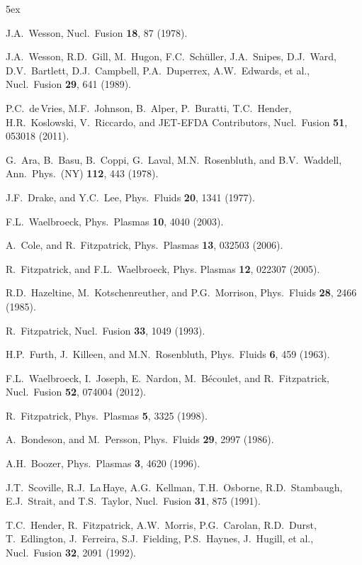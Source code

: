 \documentclass[12pt,prb,aps]{revtex4-1}
\begin{document}
\begin{thebibliography}{99}\baselineskip 5ex

 J.A.~Wesson, Nucl.\ Fusion {\bf 18}, 87 (1978).

 J.A.~Wesson, R.D.~Gill, M.~Hugon, F.C.~Sch\"{u}ller, J.A.~Snipes, D.J.~Ward, D.V.~Bartlett, 
D.J.~Campbell, P.A.~Duperrex, A.W.~Edwards, et al., Nucl.\ Fusion {\bf 29}, 641 (1989).

 P.C.~de\,Vries, M.F.~Johnson, B.~Alper, P.~Buratti, T.C.~Hender, H.R.~Koslowski, V.~Riccardo, and JET-EFDA Contributors, Nucl.\ Fusion {\bf 51}, 053018 (2011).

 G.~Ara, B.~Basu, B.~Coppi, G.~Laval, M.N.~Rosenbluth, and B.V.~Waddell, Ann.\ Phys.\ (NY) {\bf 112}, 443 (1978).

 J.F.~Drake, and Y.C.~Lee, Phys.\ Fluids {\bf 20}, 1341 (1977).

 F.L.~Waelbroeck, Phys.\ Plasmas {\bf 10}, 4040 (2003).

 A.~Cole, and R.~Fitzpatrick, Phys.\ Plasmas {\bf 13}, 032503 (2006).

 R.~Fitzpatrick, and F.L.~Waelbroeck, Phys. Plasmas {\bf 12}, 022307 (2005).

 R.D.~Hazeltine, M.~Kotschenreuther, and P.G.~Morrison, Phys.\ Fluids {\bf 28}, 2466 (1985).

 R.~Fitzpatrick, Nucl.\ Fusion {\bf 33}, 1049 (1993).

 H.P.~Furth, J.~Killeen, and M.N.~Rosenbluth, Phys.\ Fluids {\bf 6}, 459 (1963).

 F.L.~Waelbroeck,  I.~Joseph, E.~Nardon, M.~B\'{e}coulet, and R.~Fitzpatrick, Nucl.\ Fusion {\bf 52}, 074004 (2012). 

 R.~Fitzpatrick, Phys.\ Plasmas {\bf 5}, 3325 (1998). 

 A.~Bondeson, and M.~Persson, Phys.\ Fluids {\bf 29}, 2997 (1986).

 A.H.~Boozer, Phys.\ Plasmas {\bf 3}, 4620 (1996). 

 J.T.~Scoville, R.J.~La\,Haye, A.G.~Kellman, T.H.~Osborne, R.D.~Stambaugh, E.J.~Strait, and T.S.~Taylor, Nucl.\ Fusion {\bf 31}, 875 (1991).

 T.C.~Hender, R.~Fitzpatrick, A.W.~Morris, P.G.~Carolan, R.D.~Durst, T.~Edlington, J.~Ferreira, 
S.J.~Fielding, P.S.~Haynes, J.~Hugill, et al., Nucl.\ Fusion {\bf 32}, 2091 (1992).


\end{thebibliography}
\end{document}
